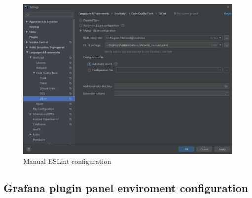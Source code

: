 \begin{figure}[H]
		\centering
		\includegraphics[scale=0.60]{../Developer_manual/img/manual_eslint_configuration.JPG}
		\caption{Manual ESLint configuration}
	\end{figure}	

	
	\subsection{Grafana plugin panel enviroment configuration}
	
	
